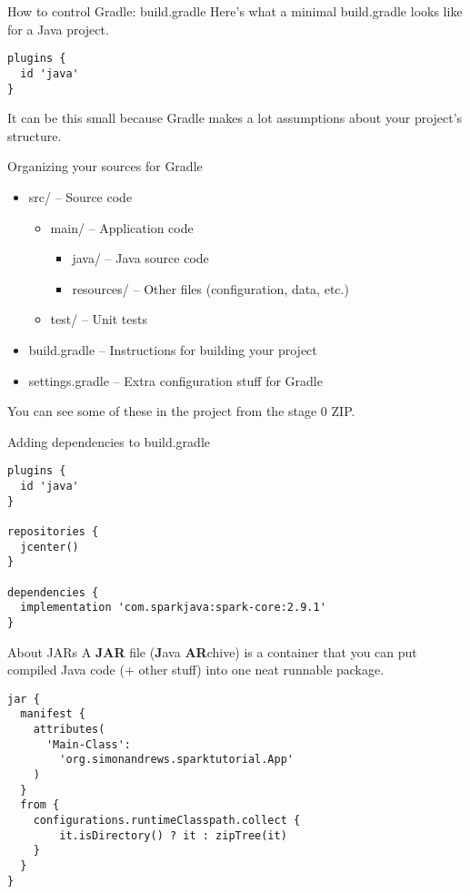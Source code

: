 \begin{frame}[fragile]{How to control Gradle: build.gradle}
Here's what a minimal build.gradle looks like for a Java project.
\begin{verbatim}
plugins {
  id 'java'
}
\end{verbatim}
It can be this small because Gradle makes a lot assumptions about your project's structure.
\end{frame}

\begin{frame}{Organizing your sources for Gradle}
\begin{itemize}
    \item src/ -- Source code
    \begin{itemize}
        \item main/ -- Application code
        \begin{itemize}
            \item java/ -- Java source code
            \item resources/ -- Other files (configuration, data, etc.)
        \end{itemize}
        \item test/ -- Unit tests
    \end{itemize}
    \item build.gradle -- Instructions for building your project
    \item settings.gradle -- Extra configuration stuff for Gradle
\end{itemize}
You can see some of these in the project from the stage 0 ZIP.
\end{frame}

\begin{frame}[fragile]{Adding dependencies to build.gradle}
\begin{verbatim}
plugins {
  id 'java'
}

repositories {
  jcenter()
}

dependencies {
  implementation 'com.sparkjava:spark-core:2.9.1'
}
\end{verbatim}
\end{frame}

\begin{frame}[fragile]{About JARs}
A \textbf{JAR} file (\textbf{J}ava \textbf{AR}chive) is a container that you can put compiled Java code (+ other stuff) into one neat runnable package.
\begin{verbatim}
jar {
  manifest {
    attributes(
      'Main-Class':
        'org.simonandrews.sparktutorial.App'
    )
  }
  from {
    configurations.runtimeClasspath.collect {
        it.isDirectory() ? it : zipTree(it)
    }
  }
}
\end{verbatim}
\end{frame}

